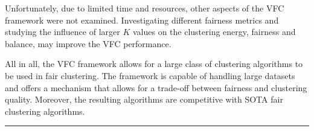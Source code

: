 Unfortunately, due to limited time and resources, other aspects of the VFC framework were not examined. Investigating different fairness metrics and studying the influence of larger $K$ values on the clustering energy, fairness and balance, may improve the VFC performance.


All in all, the VFC framework allows for a large class of clustering algorithms to be used in fair clustering. The framework is capable of handling large datasets and offers a mechanism that allows for a trade-off between fairness and clustering quality. Moreover, the resulting algorithms are competitive with SOTA fair clustering algorithms.

\newpage


\nolinenumbers
\vspace*{\fill}
\hrule
\linenumbers

